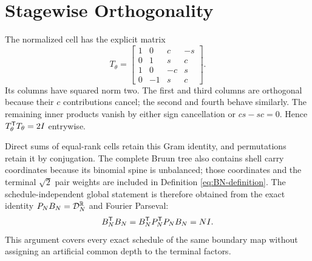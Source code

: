 \section{Stagewise Orthogonality}
\label{app:orthogonality}

The normalized cell has the explicit matrix
\begin{equation}
 T_\theta=
 \begin{bmatrix}
 1&0&c&-s\\
 0&1&s&c\\
 1&0&-c&s\\
 0&-1&s&c
 \end{bmatrix}.
 \label{eq:cell-matrix}
\end{equation}
Its columns have squared norm two.  The first and third columns are orthogonal
because their $c$ contributions cancel; the second and fourth behave
similarly.  The remaining inner products vanish by either sign cancellation or
$cs-sc=0$.  Hence $T_\theta^{\mathsf{T}}T_\theta=2I$ entrywise.

Direct sums of equal-rank cells retain this Gram identity, and permutations
retain it by conjugation.  The complete Bruun tree also contains shell carry
coordinates because its binomial spine is unbalanced; those coordinates and
the terminal $\sqrt2$ pair weights are included in Definition
\ref{eq:BN-definition}.  The schedule-independent global statement is therefore
obtained from the exact identity $P_NB_N=\mathcal{D}_N^{\mathbb{R}}$ and Fourier Parseval:
\begin{equation}
 B_N^{\mathsf{T}}B_N
 =B_N^{\mathsf{T}}P_N^{\mathsf{T}}P_NB_N=NI.
\end{equation}
This argument covers every exact schedule of the same boundary map without
assigning an artificial common depth to the terminal factors.
